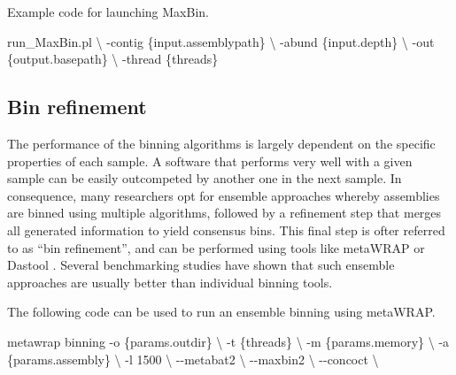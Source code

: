 \documentclass[
]{book}
\newenvironment{Shaded}{\begin{snugshade}}{\end{snugshade}}
\newcommand{\AttributeTok}[1]{\textcolor[rgb]{0.13,0.29,0.53}{#1}}
\newcommand{\DataTypeTok}[1]{\textcolor[rgb]{0.13,0.29,0.53}{#1}}
\newcommand{\ExtensionTok}[1]{#1}
\newcommand{\NormalTok}[1]{#1}
\begin{document}
\normalsize

Example code for launching MaxBin.
\small

\begin{Shaded}
\begin{Highlighting}[]
\ExtensionTok{run\_MaxBin.pl} \DataTypeTok{\textbackslash{}}
    \AttributeTok{{-}contig}\NormalTok{ \{input.assemblypath\} }\DataTypeTok{\textbackslash{}}
    \AttributeTok{{-}abund}\NormalTok{ \{input.depth\} }\DataTypeTok{\textbackslash{}}
    \AttributeTok{{-}out}\NormalTok{ \{output.basepath\} }\DataTypeTok{\textbackslash{}}
    \AttributeTok{{-}thread}\NormalTok{ \{threads\}}
\end{Highlighting}
\end{Shaded}

\normalsize

\hypertarget{genome-resolved-refinement}{%
\subsection*{Bin refinement}\label{genome-resolved-refinement}}

The performance of the binning algorithms is largely dependent on the specific properties of each sample. A software that performs very well with a given sample can be easily outcompeted by another one in the next sample. In consequence, many researchers opt for ensemble approaches whereby assemblies are binned using multiple algorithms, followed by a refinement step that merges all generated information to yield consensus bins. This final step is ofter referred to as ``bin refinement'', and can be performed using tools like metaWRAP \citep{Uritskiy2018-my} or Dastool \citep{Sieber2018-fp}. Several benchmarking studies have shown that such ensemble approaches are usually better than individual binning tools.

The following code can be used to run an ensemble binning using metaWRAP.
\small

\begin{Shaded}
\begin{Highlighting}[]
\ExtensionTok{metawrap}\NormalTok{ binning }\AttributeTok{{-}o}\NormalTok{ \{params.outdir\} }\DataTypeTok{\textbackslash{}}
    \AttributeTok{{-}t}\NormalTok{ \{threads\} }\DataTypeTok{\textbackslash{}}
    \AttributeTok{{-}m}\NormalTok{ \{params.memory\} }\DataTypeTok{\textbackslash{}}
    \AttributeTok{{-}a}\NormalTok{ \{params.assembly\} }\DataTypeTok{\textbackslash{}}
    \AttributeTok{{-}l}\NormalTok{ 1500 }\DataTypeTok{\textbackslash{}}
    \AttributeTok{{-}{-}metabat2} \DataTypeTok{\textbackslash{}}
    \AttributeTok{{-}{-}maxbin2} \DataTypeTok{\textbackslash{}}
    \AttributeTok{{-}{-}concoct} \DataTypeTok{\textbackslash{}}
\end{Highlighting}
\end{Shaded}
\end{document}
